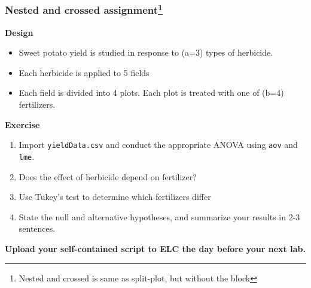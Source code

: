 \documentclass[color=usenames,dvipsnames]{beamer}\usepackage[]{graphicx}\usepackage[]{color}
\newcommand{\inr}[1]{\colorbox{inlinecolor}{\texttt{#1}}}
\begin{document}
\begin{frame}[fragile]
  \frametitle{Nested and crossed assignment\footnote{Nested and crossed
      is same as split-plot, but without the block}}

\small
{\bf Design}
\begin{itemize}%
\small
  \item Sweet potato yield is studied in response to (a=3)
    types of herbicide.
  \item Each herbicide is applied to 5 fields
  \item Each field is divided into 4 plots. Each plot is treated with
    one of (b=4) fertilizers.
\end{itemize}
{\bf Exercise}
\begin{enumerate}[(1)]%
\small
  \item Import {\tt yieldData.csv} and conduct
    the appropriate ANOVA using \inr{aov} and \inr{lme}.
  \item Does the effect of herbicide depend on fertilizer?
  \item Use Tukey's test to determine which fertilizers differ
  \item State the null and alternative hypotheses, and summarize your
    results in 2-3 sentences. 
\end{enumerate}
\footnotesize
\bf
Upload your self-contained script to ELC the day before your next
lab. \\
\vfill
\end{frame}






\end{document}
